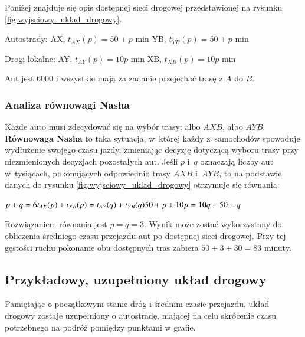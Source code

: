 \documentclass[twoside,12pt]{report}
\begin{document}
Poniżej znajduje się opis dostępnej sieci drogowej przedstawionej na rysunku \ref{fig:wyjsciowy_uklad_drogowy}.

Autostrady:\newline
AX, $t_{AX}(p) =  50 + p$ min\newline
YB, $t_{YB}(p) =  50 + p$ min\newline

Drogi lokalne:\newline
AY, $t_{AY}(p) =  10p$ min\newline
XB, $t_{XB}(p) =  10p$ min\newline

Aut jest 6000 i wszystkie mają za zadanie przejechać trasę z $A$ do $B$.


\subsubsection{Analiza równowagi Nasha}

Każde auto musi zdecydować się na wybór trasy: albo $AXB$, albo $AYB$. \textbf{Równowaga Nasha} to taka sytuacja, w~której każdy z~samochodów spowoduje wydłużenie swojego czasu jazdy, zmieniając decyzję dotyczącą wyboru trasy przy niezmienionych decyzjach pozostałych aut. Jeśli $p$ i~$q$ oznaczają liczby aut w~tysiącach, pokonujących odpowiednio trasy $AXB$ i~$AYB$, to na podstawie danych do rysunku \ref{fig:wyjsciowy_uklad_drogowy} otrzymuje się równania:

\begin{center}
\begin{math}\label{eq:nash1}
p+q = 6 \newline
t_{AX}(p)+t_{XB}(p) = t_{AY}(q) + t_{YB}(q) \newline
50+p+10p = 10q+50+q \newline
\end{math}
\end{center}

Rozwiązaniem równania jest $p=q=3$. Wynik może zostać wykorzystany do obliczenia średniego czasu przejazdu aut po dostępnej sieci drogowej. Przy tej gęstości ruchu pokonanie obu dostępnych tras zabiera $50+3+30=83$ minuty.

\subsection{Przykładowy, uzupełniony układ drogowy}

Pamiętając o początkowym stanie dróg i średnim czasie przejazdu, układ drogowy zostaje uzupełniony o autostradę, mającej na celu skrócenie czasu potrzebnego na podróż pomiędzy punktami w grafie.
\end{document}

